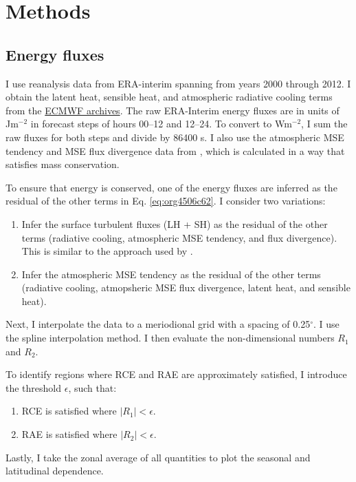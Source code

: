 \documentclass[11pt]{article}
\begin{document}
\section{Methods}
\label{sec:org7625311}
\subsection{Energy fluxes}
\label{sec:org89987df}
I use reanalysis data from ERA-interim spanning from years 2000 through 2012. I obtain the latent heat, sensible heat, and atmospheric radiative cooling terms from the \href{https://apps.ecmwf.int/datasets/data/interim-mdfa/levtype=sfc/}{ECMWF archives}. The raw ERA-Interim energy fluxes are in units of Jm\(^{-2}\) in forecast steps of hours 00--12 and 12--24. To convert to Wm\(^{-2}\), I sum the raw fluxes for both steps and divide by 86400 s. I also use the atmospheric MSE tendency and MSE flux divergence data from \cite{donohoe_seasonal_2013}, which is calculated in a way that satisfies mass conservation.

To ensure that energy is conserved, one of the energy fluxes are inferred as the residual of the other terms in Eq. \ref{eq:org4506c62}. I consider two variations:
\begin{enumerate}
\item Infer the surface turbulent fluxes (LH + SH) as the residual of the other terms (radiative cooling, atmospheric MSE tendency, and flux divergence). This is similar to the approach used by \cite{donohoe_seasonal_2013}.
\item Infer the atmospheric MSE tendency as the residual of the other terms (radiative cooling, atmopsheric MSE flux divergence, latent heat, and sensible heat).
\end{enumerate}

Next, I interpolate the data to a meriodional grid with a spacing of 0.25\(^\circ\). I use the spline interpolation method. I then evaluate the non-dimensional numbers \(R_1\) and \(R_2\).

To identify regions where RCE and RAE are approximately satisfied, I introduce the threshold \(\epsilon\), such that:
\begin{enumerate}
\item RCE is satisfied where \(|R_1| < \epsilon\).
\item RAE is satisfied where \(|R_2| < \epsilon\).
\end{enumerate}

Lastly, I take the zonal average of all quantities to plot the seasonal and latitudinal dependence.
\end{document}
